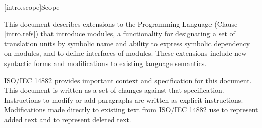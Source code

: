 
[intro.scope]{Scope}

\pnum
This document describes extensions to the \Cpp
Programming Language (Clause \ref{intro.refs}) that introduce modules,
a functionality for designating a set of translation units by symbolic
name and ability to express symbolic dependency on modules, and to
define interfaces of modules.  These extensions include 
new syntactic forms and modifications to existing language semantics.

\pnum
ISO/IEC 14882 provides important context
and specification for this document. This document is 
written as a set of changes against that specification. Instructions
to modify or add paragraphs are written as explicit instructions. 
Modifications made directly to existing text from ISO/IEC 14882 use  to represent added text and
 to represent deleted text.


